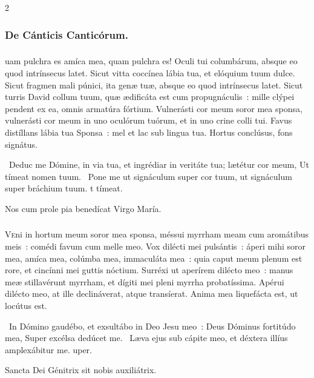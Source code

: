 \documentclass[9pt,twoside]{extarticle}
\begin{document}
\begin{multicols}{2}
\subsubsection*{\center De Cánticis Canticórum.}
\subsubsection*{\center {}}
uam pulchra es amíca mea, quam pulchra es! Oculi tui columbárum, absque eo quod intrínsecus latet. 
Sicut vitta coccínea lábia tua, et elóquium tuum dulce. Sicut fragmen mali púnici, ita genæ tuæ, absque eo quod intrínsecus latet.
Sicut turris David collum tuum, quæ ædificáta est cum propugnáculis~: mille clýpei pendent ex ea, omnis armatúra fórtium.
Vulnerásti cor meum soror mea sponsa, vulnerásti cor meum in uno oculórum tuórum, et in uno crine colli tui.
Favus distíllans lábia tua Sponsa~: mel et lac sub lingua tua.
Hortus conclúsus, fons signátus.

\begin{tightlist}{}
\item {}~Deduc me Dómine, in via tua, et ingrédiar in veritáte tua; lætétur cor meum, \textred{*} Ut tímeat nomen tuum. ~Pone me ut signáculum super cor tuum, ut signáculum super bráchium tuum. t tímeat.
\item {} Nos cum prole pia benedícat Virgo María.
\end{tightlist}

\subsubsection*{\center {}}
\lettrine{V}eni in hortum meum soror mea sponsa, méssui myrrham meam cum aromátibus meis~: comédi favum cum melle meo.
Vox dilécti mei pulsántis~: áperi mihi soror mea, amíca mea, colúmba mea, immaculáta mea~: quia caput meum plenum est rore, et cincínni mei guttis nóctium.
Surréxi ut aperírem dilécto meo~: manus meæ stillavérunt myrrham, et dígiti mei pleni myrrha probatíssima.
Apérui dilécto meo, at ille declináverat, atque transíerat. Anima mea liquefácta est, ut locútus est.

\begin{tightlist}{}
\item {}~In Dómino gaudébo, et exsultábo in Deo Jesu meo~: Deus Dóminus fortitúdo mea, \textred{*} Super excélsa dedúcet me. ~Læva ejus sub cápite meo, et déxtera illíus amplexábitur me. uper.
\item {} Sancta Dei Génitrix sit nobis auxiliátrix.
\end{tightlist}


\end{multicols}
\end{document}
